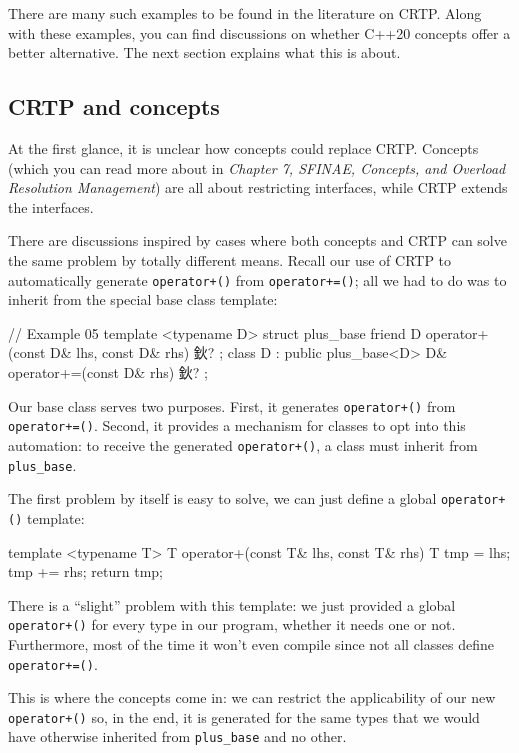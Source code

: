 There are many such examples to be found in the literature on CRTP. Along with these examples, you can find discussions on whether C++20 concepts offer a better alternative. The next section explains what this is about.

\subsection{CRTP and concepts}

At the first glance, it is unclear how concepts could replace CRTP. Concepts (which you can read more about in \emph{Chapter 7, SFINAE, Concepts, and Overload Resolution Management}) are all about restricting interfaces, while CRTP extends the interfaces.

There are discussions inspired by cases where both concepts and CRTP can solve the same problem by totally different means. Recall our use of CRTP to automatically generate \texttt{operator+()} from \texttt{operator+=()}; all we had to do was to inherit from the special base class template:

\begin{code}
// Example 05
template <typename D> struct plus_base {
  friend D operator+(const D& lhs, const D& rhs) { 鈥?}
};
class D : public plus_base<D> {
  D& operator+=(const D& rhs) { 鈥?}
};
\end{code}

Our base class serves two purposes. First, it generates \texttt{operator+()} from \texttt{operator+=()}. Second, it provides a mechanism for classes to opt into this automation: to receive the generated \texttt{operator+()}, a class must inherit from \texttt{plus\_base}.

The first problem by itself is easy to solve, we can just define a global \texttt{operator+()} template:

\begin{code}
template <typename T>
T operator+(const T& lhs, const T& rhs) {
  T tmp = lhs;
  tmp += rhs;
  return tmp;
}
\end{code}

There is a ``slight'' problem with this template: we just provided a global \texttt{operator+()} for every type in our program, whether it needs one or not. Furthermore, most of the time it won't even compile since not all classes define \texttt{operator+=()}.

This is where the concepts come in: we can restrict the applicability of our new \texttt{operator+()} so, in the end, it is generated for the same types that we would have otherwise inherited from \texttt{plus\_base} and no other.

